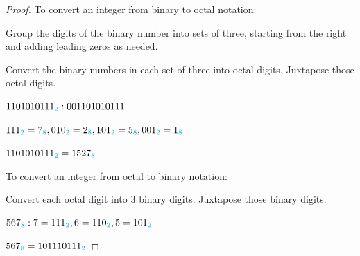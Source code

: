 \documentclass[14pt]{extarticle}
\newcommand{\base}[1]{{\color{cyan}#1}}
\begin{document}
\begin{proof}
To convert an integer from binary to octal notation:

Group the digits of the binary number into sets of three, starting from the right and adding leading zeros as needed.

Convert the binary numbers in each set of three into octal digits. Juxtapose those octal digits.

$1101010111_\base{2}: 001 101 010 111$

$111_\base{2} = 7_\base{8}, 010_\base{2} = 2_\base{8}, 101_\base{2} = 5_\base{8}, 001_\base{2} = 1_\base{8}$

$1101010111_\base{2} = 1527_\base{8}$

To convert an integer from octal to binary notation:

Convert each octal digit into 3 binary digits. Juxtapose those binary digits.

$567_\base{8}:  7 = 111_\base{2}, 6 = 110_\base{2}, 5 = 101_\base{2}$

$567_\base{8} = 101110111_\base{2}$
\end{proof}
\end{document}
